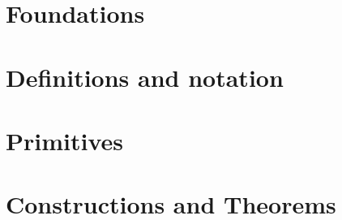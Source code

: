 \documentclass[final]{scrartcl}
\begin{document}
\maketitle

\clearpage

\tableofcontents
\clearpage



\clearpage
\section{Foundations} \label{section:foundations}
    
            
   
         
    
          


\clearpage
\section{Definitions and notation} \label{section:definitions}
      
            
      
        


\clearpage
\section{Primitives} \label{section:primitives}






 



\clearpage
\section{Constructions and Theorems} \label{section:theorems}




\end{document}
